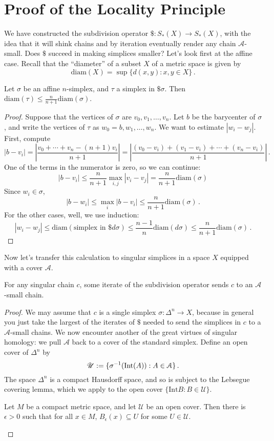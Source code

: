 \section{Proof of the Locality Principle}

We have constructed the subdivision operator $\$:S_*(X)\to S_*(X)$, with the
idea that it will shink chains and by iteration eventually render any chain 
$\mathscr{A}$-small. Does $\$$ succeed in making simplices smaller? Let's 
look first at the affine case. Recall that the ``diameter'' of a subset $X$ of 
a metric space is given by
\[
\mathrm{diam}(X)=\sup\{d(x,y):x,y\in X\}\,.
\]

\begin{lemma}
Let $\sigma$ be an affine $n$-simplex, and $\tau$ a simplex in $\$\sigma$.
Then $\mathrm{diam}(\tau)\leq \frac{n}{n+1}\mathrm{diam}(\sigma)$.
\end{lemma}
\begin{proof}
Suppose that the vertices of $\sigma$ are $v_0,v_1,\ldots,v_n$. Let $b$ be the 
barycenter of $\sigma$, and write the vertices of $\tau$ as $w_0=b,w_1,\ldots,w_n$. We want to estimate $|w_i-w_j|$. First, compute
\[
|b-v_i|  =\left|\frac{v_0+\cdots+v_n-(n+1)v_i}{n+1}\right|
=\left|\frac{(v_0-v_i)+(v_1-v_i)+\cdots+(v_n-v_i)}{n+1}\right|\,.
\]
One of the terms in the numerator is zero, so we can continue: 
\[
|b-v_i| \leq \frac{n}{n+1}\max_{i,j}|v_i-v_j| 
= \frac{n}{n+1}\mathrm{diam}(\sigma)
\]
Since $w_i\in\sigma$, 
\[
|b-w_i| \leq\max_i|b-v_i| \leq \frac{n}{n+1}\mathrm{diam}(\sigma)\,.
\]
For the other cases, well, we use induction:
\[
|w_i-w_j| \leq \mathrm{diam}(\text{simplex in }\$d\sigma)
\leq \frac{n-1}{n}\mathrm{diam}(d\sigma)
\leq \frac{n}{n+1}\mathrm{diam}(\sigma)\,.
\]
\end{proof}

Now let's transfer this calculation to singular simplices in a space $X$ 
equipped with a cover $\mathscr{A}$. 
\begin{lemma}
For any singular chain $c$, some iterate of the subdivision operator sends $c$ to an $\mathscr{A}$-small chain.
\end{lemma}
\begin{proof} We may assume that $c$ is a single simplex $\sigma:\Delta^n\to X$, because in general you just take the largest of the iterates of $\$$ needed to send the simplices in $c$ to a $\mathscr{A}$-small chains.
We now encounter another of the great virtues of singular homology:
we pull $\mathscr{A}$ back to a cover of the standard simplex. 
Define an open cover of $\Delta^n$ by 
\[
\mathscr{U}:=\{\sigma^{-1}(\mathrm{Int}(A)):A\in\mathcal{A}\}\,.
\]
The space $\Delta^n$ is a compact Hausdorff space, and so is subject to the
Lebsegue covering lemma, which we apply to the open cover 
$\{\mathrm{Int}B:B\in\mathscr{U}\}$. 
\begin{lemma}
Let $M$ be a compact metric space, and let $\mathscr{U}$ be an open cover. Then there is $\epsilon> 0$ such that for all $x\in M$, 
$B_\epsilon(x)\subseteq U$ for some $U\in \mathscr{U}$.
\end{lemma}
\end{proof}

